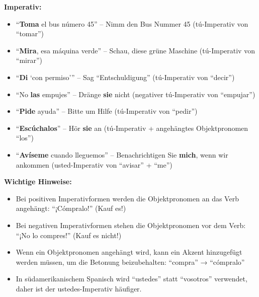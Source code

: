 \documentclass[12pt,a4paper]{article}
\begin{document}
\textbf{Imperativ:}
\begin{itemize}[leftmargin=*]
    \item \enquote{\textbf{Toma} el bus número 45} -- Nimm den Bus Nummer 45 (tú-Imperativ von \enquote{tomar})
    \item \enquote{\textbf{Mira}, esa máquina verde} -- Schau, diese grüne Maschine (tú-Imperativ von \enquote{mirar})
    \item \enquote{\textbf{Di} \enquote{con permiso}} -- Sag \enquote{Entschuldigung} (tú-Imperativ von \enquote{decir})
    \item \enquote{No \textbf{las} empujes} -- Dränge \textbf{sie} nicht (negativer tú-Imperativ von \enquote{empujar})
    \item \enquote{\textbf{Pide} ayuda} -- Bitte um Hilfe (tú-Imperativ von \enquote{pedir})
    \item \enquote{\textbf{Escúchalos}} -- Hör \textbf{sie} an (tú-Imperativ + angehängtes Objektpronomen \enquote{los})
    \item \enquote{\textbf{Avíseme} cuando lleguemos} -- Benachrichtigen Sie \textbf{mich}, wenn wir ankommen (usted-Imperativ von \enquote{avisar} + \enquote{me})
\end{itemize}

\textbf{Wichtige Hinweise:}
\begin{itemize}[leftmargin=*]
    \item Bei positiven Imperativformen werden die Objektpronomen an das Verb angehängt: \enquote{¡Cómpralo!} (Kauf es!)
    \item Bei negativen Imperativformen stehen die Objektpronomen vor dem Verb: \enquote{¡No lo compres!} (Kauf es nicht!)
    \item Wenn ein Objektpronomen angehängt wird, kann ein Akzent hinzugefügt werden müssen, um die Betonung beizubehalten: \enquote{compra} → \enquote{cómpralo}
    \item In südamerikanischem Spanisch wird \enquote{ustedes} statt \enquote{vosotros} verwendet, daher ist der ustedes-Imperativ häufiger.
\end{itemize}
\end{document}

